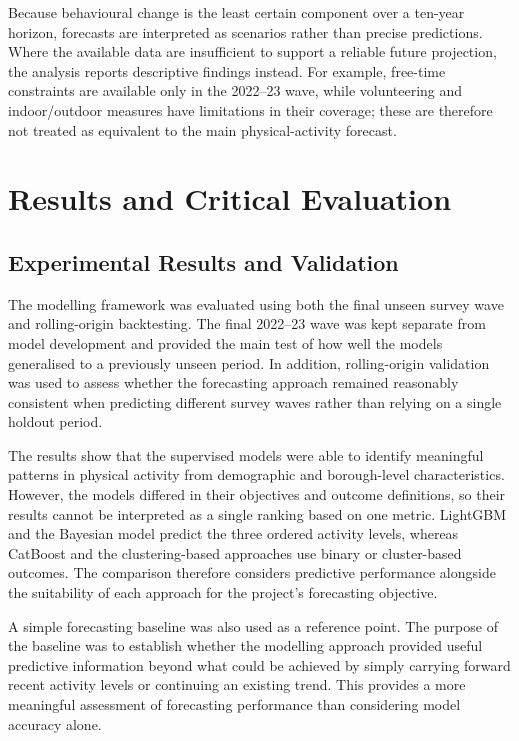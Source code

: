 \documentclass[ %
                    author={Ashrey Ashrey, Sanya Kapoor, Trisha Sharma, Yash Bhooshan Pandloskar},
                supervisor={Dr. Dalila O’Grady},
                    degree={MSc},
                     title={Using machine learning to forecast physical activity participation, volunteering and activity patterns in London},
                  subtitle={},
                      type={},
                      year={2021}]{dissertation}
\begin{document}
Because behavioural change is the least certain component over a ten-year horizon, forecasts are interpreted as scenarios rather than precise predictions. Where the available data are insufficient to support a reliable future projection, the analysis reports descriptive findings instead. For example, free-time constraints are available only in the 2022--23 wave, while volunteering and indoor/outdoor measures have limitations in their coverage; these are therefore not treated as equivalent to the main physical-activity forecast.


\chapter{Results and Critical Evaluation}
\label{chap:evaluation}

\FloatBarrier
\section{Experimental Results and Validation}

\noindent
The modelling framework was evaluated using both the final unseen survey wave and rolling-origin backtesting. The final 2022--23 wave was kept separate from model development and provided the main test of how well the models generalised to a previously unseen period. In addition, rolling-origin validation was used to assess whether the forecasting approach remained reasonably consistent when predicting different survey waves rather than relying on a single holdout period.

The results show that the supervised models were able to identify meaningful patterns in physical activity from demographic and borough-level characteristics. However, the models differed in their objectives and outcome definitions, so their results cannot be interpreted as a single ranking based on one metric. LightGBM and the Bayesian model predict the three ordered activity levels, whereas CatBoost and the clustering-based approaches use binary or cluster-based outcomes. The comparison therefore considers predictive performance alongside the suitability of each approach for the project's forecasting objective.

A simple forecasting baseline was also used as a reference point. The purpose of the baseline was to establish whether the modelling approach provided useful predictive information beyond what could be achieved by simply carrying forward recent activity levels or continuing an existing trend. This provides a more meaningful assessment of forecasting performance than considering model accuracy alone.
\end{document}

